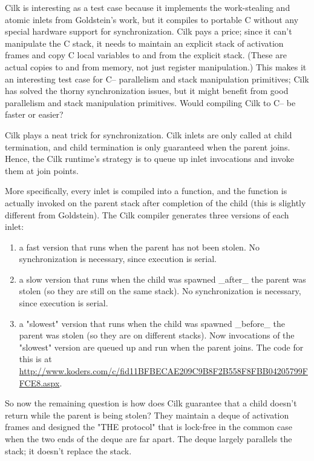 \documentclass[twoside,12pt]{article}
\begin{document}
Cilk is interesting as a test case because it implements the work-stealing and
atomic inlets from Goldstein's work, but it compiles to portable C without any
special hardware support for synchronization.  Cilk pays a price; since it
can't manipulate the C stack, it needs to maintain an explicit stack of
activation frames and copy C local variables to and from the explicit stack.
(These are actual copies to and from memory, not just register manipulation.)
This makes it an interesting test case for C-- parallelism and stack
manipulation primitives; Cilk has solved the thorny synchronization issues, but
it might benefit from good parallelism and stack manipulation primitives.  Would compiling Cilk to C-- be faster or easier?

Cilk plays a neat trick for synchronization.  Cilk inlets are only called at child termination, and child termination is only guaranteed when the parent joins.  Hence, the Cilk runtime's strategy is to queue up inlet invocations and invoke them at join points.

More specifically, every
inlet is compiled into a function, and the function is actually
invoked on the parent stack after completion of the child (this is
slightly different from Goldstein).  The Cilk compiler generates three
versions of each inlet:
\begin{enumerate}
\item a fast version that runs when the parent has not been stolen.  No
   synchronization is necessary, since execution is serial.
\item a slow version that runs when the child was spawned _after_
   the parent was stolen (so they are still on the same stack).  No
   synchronization is necessary, since execution is serial.
\item a "slowest" version that runs when the child was spawned _before_
   the parent was stolen (so they are on different stacks).  Now
   invocations of the "slowest" version are queued up and run
   when the parent joins.  The code for this is at
   \url{http://www.koders.com/c/fid11BFBECAE209C9B8F2B558F8FBB04205799FFCE8.aspx}.
\end{enumerate}

So now the remaining question is how does Cilk guarantee that a child
doesn't return while the parent is being stolen?  They maintain a
deque of activation frames and designed the "THE protocol" that is
lock-free in the common case when the two ends of the deque are far
apart.  The deque largely parallels the stack; it doesn't replace the
stack.
\end{document}
